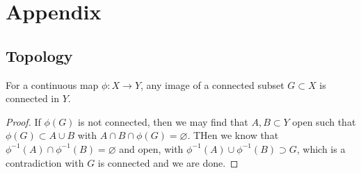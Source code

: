 \appendix

\section{Appendix}

\subsection{Topology}

\begin{lemma}
    \label{lem: connected-image}
    For a continuous map $\phi: X \to Y$, any image of a connected subset $G \subset X$ is connected in $Y$.
\end{lemma}
\begin{proof}
    If $\phi(G)$ is not connected, then we may find that $A,B\subset Y$ open such that $\phi(G) \subset A\cup B$ with $A\cap B \cap \phi(G) = \varnothing$. THen we know that $\phi^{-1}(A) \cap \phi^{-1}(B) = \varnothing$ and open, with $\phi^{-1}(A)\cup \phi^{-1}(B) \supset G$, which is a contradiction with $G$ is connected and we are done.
\end{proof}